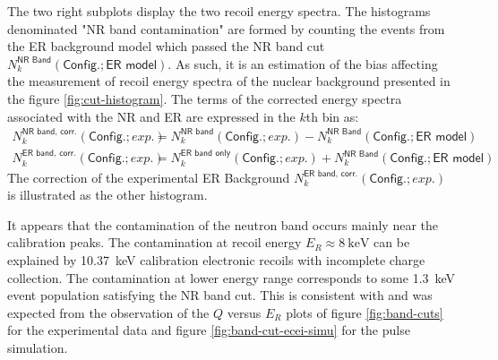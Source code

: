 The two right subplots display the two recoil energy spectra. The histograms denominated "NR band contamination" are formed by counting the events from the ER background model which passed the NR band cut $N_k^{\textsf{NR Band}}(\textsf{Config.}; \textsf{ER model})$. As such, it is an estimation of the bias affecting the measurement of recoil energy spectra of the nuclear background presented in the figure \ref{fig:cut-histogram}. 
The terms of the corrected energy spectra associated with the NR and ER are expressed in the $k$th bin as:
\begin{align}
N_k^{\textsf{NR band, corr.}}(\textsf{Config.}; exp.)
&=
N_k^{\textsf{NR band}}(\textsf{Config.}; exp.)
-
N_k^{\textsf{NR Band}}(\textsf{Config.}; \textsf{ER model})
\\
N_k^{\textsf{ER band, corr.}}(\textsf{Config.}; exp.)
&=
N_k^{\textsf{ER band only}}(\textsf{Config.}; exp.)
+
N_k^{\textsf{NR Band}}(\textsf{Config.}; \textsf{ER model})
\end{align}
The correction of the experimental ER Background $N_k^{\textsf{ER band, corr.}}(\textsf{Config.}; exp.)$ is illustrated as the other histogram.

It appears that the contamination of the neutron band occurs mainly near the calibration peaks. The contamination at recoil energy $E_R \approx \SI{8}{\kilo\eV}$ can be explained by \SI{10.37}{\kilo\eV} calibration electronic recoils with incomplete charge collection. The contamination at lower energy range corresponds to some \SI{1.3}{\kilo\eV} event population satisfying the NR band cut. This is consistent with and was expected from the observation of the $Q$ versus $E_R$ plots of figure \ref{fig:band-cuts} for the experimental data and figure \ref{fig:band-cut-ecei-simu} for the pulse simulation.


